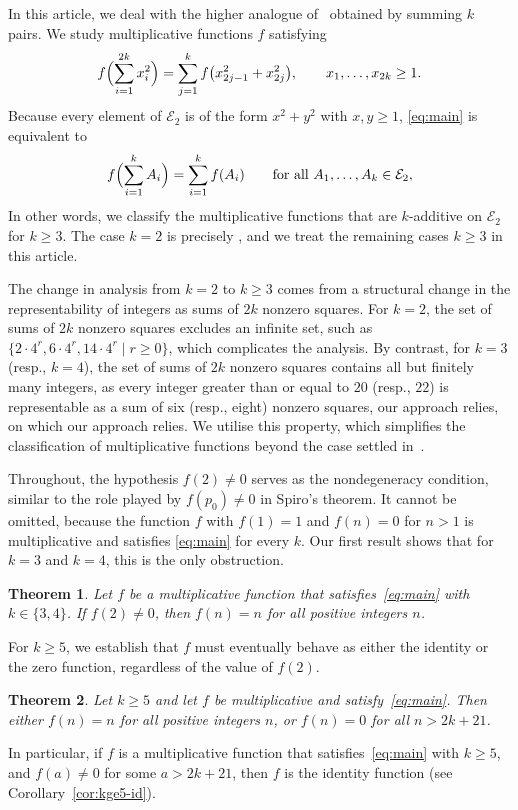 \documentclass[11pt,a4paper]{amsart}
\newcommand{\E}{\mathcal{E}}
\theoremstyle{plain}
\newtheorem{theorem}{Theorem}[section]
\theoremstyle{definition}
\begin{document}
In this article, we deal with the higher analogue of~\cite{ParkTwoSquares} obtained by summing $k$ pairs. We study multiplicative functions $f$ satisfying
\begin{equation}\label{eq:main}
   f\Bigl(\sum_{i=1}^{2k}x_i^2\Bigr)=\sum_{j=1}^{k}f\bigl(x_{2j-1}^2+x_{2j}^2\bigr),
   \qquad x_1,\dots,x_{2k}\ge 1 .
\end{equation}
Because every element of $\E_2$ is of the form $x^2+y^2$ with $x,y\ge 1$,
\eqref{eq:main} is equivalent to
\begin{equation}\label{eq:reduced}
   f\Bigl(\sum_{i=1}^{k}A_i\Bigr)=\sum_{i=1}^{k}f(A_i)
   \qquad\text{for all } A_1,\dots,A_k\in\E_2 ,
\end{equation}
In other words, we classify the multiplicative functions that are $k$-additive on $\E_2$ for $k\ge 3$. The case $k=2$ is precisely \cite[Theorem~1]{ParkTwoSquares}, and we treat the remaining cases $k\ge 3$ in this article.

The change in analysis from $k=2$ to $k \ge 3$ comes from a structural  change in the representability of integers as sums of $2k$ nonzero squares. For $k=2$, the set of sums of $2k$ nonzero squares excludes an infinite set, such as $\{2\cdot 4^r, 6\cdot 4^r, 14\cdot 4^r \mid r\ge 0\}$, which complicates the analysis. By contrast, for $k = 3$ (resp., $k=4$), the set of sums of $2k$ nonzero squares contains all but finitely many integers, as every integer greater than or equal to $20$ (resp., $22$) is representable as a sum of six (resp., eight) nonzero squares, our approach relies, on which our approach relies. We utilise this property, which simplifies the classification of multiplicative functions beyond the case settled in~\cite{ParkTwoSquares}. 



Throughout, the hypothesis $f(2)\neq 0$ serves as the nondegeneracy condition, similar to the role played by $f(p_0)\neq 0$ in Spiro's theorem. It cannot be omitted, because the function
$f$ with $f(1)=1$ and $f(n)=0$ for $n>1$ is multiplicative and satisfies
\eqref{eq:main} for every $k$. Our first result shows that
for $k=3$ and $k=4$, this is the only obstruction.
\begin{theorem}\label{thm:intro-k34}
Let $f$ be a multiplicative function that satisfies~\eqref{eq:main} with
$k\in\{3,4\}$. If $f(2)\neq 0$, then $f(n)=n$ for all positive integers $n$.
\end{theorem}
For $k \ge 5$, we establish that $f$ must eventually behave as either the identity or the zero function, regardless of the value of $f(2)$.
\begin{theorem}\label{thm:kge5-intro}
Let $k \ge 5$ and let $f$ be multiplicative and satisfy~\eqref{eq:main}. Then either $f(n) = n$ for all positive integers $n$, or $f(n) = 0$ for all $n > 2k + 21$.
\end{theorem}
In particular, if $f$ is a multiplicative function that satisfies~\eqref{eq:main} with $k\ge 5$, and $f(a)\neq 0$ for some $a>2k+21$, then $f$ is the identity function (see Corollary~\ref{cor:kge5-id}).
\end{document}
